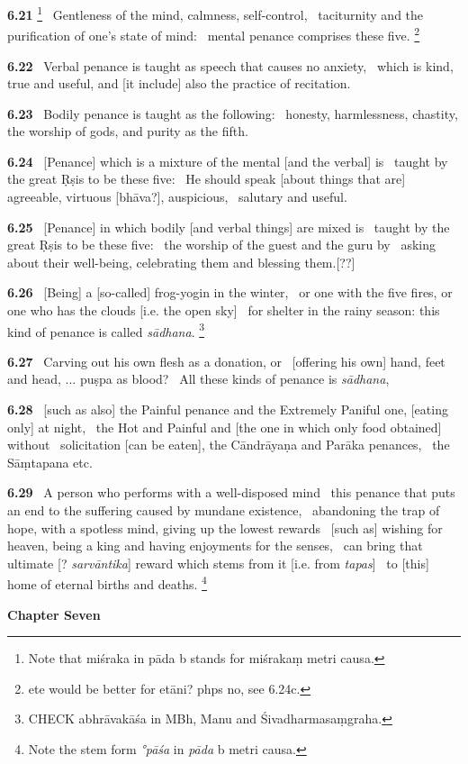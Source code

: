 \documentclass{article}
\newcommand{\skt}[1]{\textit{#1}}
\begin{document}
\textbf{6.21}%
\footnote{Note that miśraka in pāda b stands for miśrakaṃ metri causa. }%
\ Gentleness of the mind, calmness, self-control,%
\                  taciturnity and the purification of one's state of mind:%
\                         mental penance comprises these five.%
\footnote{ete would be better for etāni? phps no, see 6.24c. }%


\textbf{6.22}%
\ Verbal penance is taught as speech that causes no anxiety,%
\                 which is kind, true and useful, and [it include] also the practice of recitation.%


\textbf{6.23}%
\ Bodily penance is taught as the following:%
\                 honesty, harmlessness, chastity, the worship of gods, and purity as the fifth.%


\textbf{6.24}%
\ [Penance] which is a mixture of the mental [and the verbal] is%
\                 taught by the great Ṛṣis to be these five:%
\                 He should speak [about things that are] agreeable, virtuous [bhāva?], auspicious,%
\                 salutary and useful.%


\textbf{6.25}%
\ [Penance] in which bodily [and verbal things] are mixed is%
\              taught by the great Ṛṣis to be these five:%
\                 the worship of the guest and the guru by%
\                 asking about their well-being, celebrating them and blessing them.[??]%


\textbf{6.26}%
\ [Being] a [so-called] frog-yogin in the winter,%
\                         or one with the five fires, or one who has the clouds [i.e. the open sky]%
\                         for shelter in the rainy season: this kind of penance is called \skt{sādhana}.%
\footnote{CHECK abhrāvakāśa in MBh, Manu and Śivadharmasaṃgraha. }%


\textbf{6.27}%
\ Carving out his own flesh as a donation, or%
\                 [offering his own] hand, feet and head, ... puṣpa as blood?%
\                 All these kinds of penance is \skt{sādhana},%


\textbf{6.28}%
\ [such as also] the Painful penance and the Extremely Paniful one, [eating only] at night,%
\                  the Hot and Painful and [the one in which only food obtained] without%
\                  solicitation [can be eaten], the Cāndrāyaṇa and Parāka penances,%
\                  the Sāṃtapana etc.%


\textbf{6.29}%
\ A person who performs with a well-disposed mind%
\                 this penance that puts an end to the suffering caused by mundane existence,%
\                 abandoning the trap of hope, with a spotless mind, giving up the lowest rewards%
\                 [such as] wishing for heaven, being a king and having enjoyments for the senses,%
\                 can bring that ultimate [? \skt{sarvāntika}] reward which stems from it [i.e. from \skt{tapas}]%
\                 to [this] home of eternal births and deaths.%
\footnote{Note the stem form \skt{°pāśa} in \skt{pāda} b metri causa. }%
\vfill\pagebreak\begin{center}{\large\textbf{ Chapter Seven 
}}\end{center}
\end{document}
